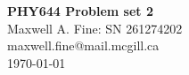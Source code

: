 \documentclass[11pt]{article}
\begin{document}
\begin{center}
    {\Large \textbf{PHY644 Problem set 2}}\\
    Maxwell A. Fine: SN 261274202 \\ 
    maxwell.fine@mail.mcgill.ca \\
    \today
\end{center}





\end{document}
